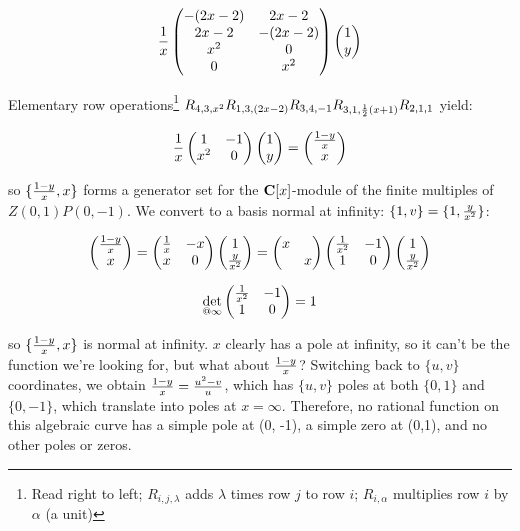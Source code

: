 
$${1\over x}\begin{pmatrix}-(2x-2) & 2x-2 \cr 2x-2 & -(2x-2) \cr x^2 & 0 \cr 0 & x^2\end{pmatrix} \begin{pmatrix}1 \cr y\end{pmatrix}$$

Elementary row operations\footnote{Read right to left; $R_{i,j,\lambda}$ adds $\lambda$ times row $j$ to row $i$; $R_{i,\alpha}$ multiplies row $i$ by $\alpha$ (a unit)} $R_{4,3,x^2} R_{1,3,(2x-2)} R_{3,4,-1} R_{3,1,{1\over2}(x+1)} R_{2,1,1} $ yield:

$${1\over x}\begin{pmatrix}1 & -1 \cr x^2 & 0\end{pmatrix} \begin{pmatrix}1 \cr y\end{pmatrix} = \begin{pmatrix}{{1-y}\over{x}} \cr x\end{pmatrix} $$

so $\{ {{1-y}\over{x}}, x \} $ forms a generator set for
the ${\bf C}[x]$-module of the finite multiples of $Z(0,1)P(0,-1)$.
We convert to a basis normal at infinity: $\{1, v\} = \{1, {y\over x^2}\}$:

$$\begin{pmatrix}{{1-y}\over{x}} \cr x\end{pmatrix} = \begin{pmatrix}{1\over x} & -x \cr x & 0\end{pmatrix} \begin{pmatrix}1 \cr {y\over x^2}\end{pmatrix}
= \begin{pmatrix}x & \cr & x\end{pmatrix} \begin{pmatrix}{1\over x^2} & -1 \cr 1 & 0\end{pmatrix} \begin{pmatrix}1 \cr {y\over x^2}\end{pmatrix}$$

$$\det_{@ \infty} \begin{pmatrix}{1\over x^2} & -1 \cr 1 & 0\end{pmatrix} = 1$$

so $\{ {{1-y}\over{x}}, x \} $ is normal at infinity.  $x$ clearly has
a pole at infinity, so it can't be the function we're looking for, but
what about ${{1-y}\over{x}}$?  Switching back to $\{u,v\}$
coordinates, we obtain ${{1-y}\over{x}} = {{u^2-v}\over u}$, which has
$\{u,v\}$ poles at both $\{0,1\}$ and $\{0,-1\}$, which translate into
poles at $x=\infty$.  Therefore, no rational function on this
algebraic curve has a simple pole at (0, -1), a simple zero at (0,1),
and no other poles or zeros.

